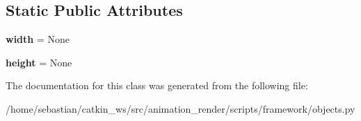 \subsection*{Static Public Attributes}
\begin{DoxyCompactItemize}
\item 
{\bfseries width} = None\hypertarget{classframework_1_1objects_1_1Plane_a7e4a9b71e7e44d83075b37b97c980b52}{}\label{classframework_1_1objects_1_1Plane_a7e4a9b71e7e44d83075b37b97c980b52}

\item 
{\bfseries height} = None\hypertarget{classframework_1_1objects_1_1Plane_aca12d83777e52195580f6416b409d027}{}\label{classframework_1_1objects_1_1Plane_aca12d83777e52195580f6416b409d027}

\end{DoxyCompactItemize}


The documentation for this class was generated from the following file\+:\begin{DoxyCompactItemize}
\item 
/home/sebastian/catkin\+\_\+ws/src/animation\+\_\+render/scripts/framework/objects.\+py\end{DoxyCompactItemize}
